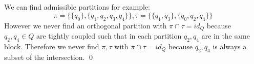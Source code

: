 \documentclass[a4paper,12pt,numbers=noenddot]{scrreport}
\begin{document}
\section{}
We can find admissible partitions for example:
$$\pi = \{\{q_0\}, \{q_1, q_2, q_3, q_4\}\}, \tau = \{\{q_1, q_3\}, \{q_0, q_2, q_4\}\}$$
However we never find an orthogonal partition with $\pi \cap \tau = id_Q$ because $q_2, q_4 \in Q$ are tightly coupled such that in each partition $q_2, q_4$ are in the same block.
Therefore we never find $\pi, \tau$ with $\pi \cap \tau = id_Q$ because ${q_2, q_4}$ is always a subset of the intersection.
\qed
\end{document}
